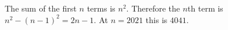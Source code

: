 The sum of the first $n$ terms is $n^2$. Therefore the $n$th term is $n^2-(n-1)^2=2n-1$. At $n=2021$ this is $\boxed{4041}$.

